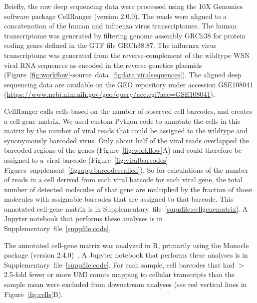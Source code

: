 \documentclass[9pt,lineno]{elife}
\begin{document}
Briefly, the raw deep sequencing data were processed using the 10X Genomics software package CellRanger (version 2.0.0).
The reads were aligned to a concatenation of the human and influenza virus transcriptomes.
The human transcriptome was generated by filtering genome assembly GRCh38 for protein coding genes defined in the GTF file GRCh38.87.
The influenza virus transcriptome was generated from the reverse-complement of the wildtype WSN viral RNA sequences as encoded in the reverse-genetics plasmids (Figure~\ref{fig:workflow}-source~data~\ref{figdata:viralsequences}).
The aligned deep sequencing data are available on the GEO repository under accession GSE108041 (\url{https://www.ncbi.nlm.nih.gov/geo/query/acc.cgi?acc=GSE108041}).

CellRanger calls cells based on the number of observed cell barcodes, and creates a cell-gene matrix.
We used custom Python code to annotate the cells in this matrix by the number of viral reads that could be assigned to the wildtype and synonymously barcoded virus.
Only about half of the viral reads overlapped the barcoded regions of the genes (Figure~\ref{fig:workflow}A) and could therefore be assigned to a viral barcode (Figure~\ref{fig:viralbarcodes}-Figures~supplement~\ref{figsupp:barcodescalled}).
So for calculations of the number of reads in a cell derived from each viral barcode for each viral gene, the total number of detected molecules of that gene are multiplied by the fraction of those molecules with assignable barcodes that are assigned to that barcode.
This annotated cell-gene matrix is in Supplementary~file~\ref{suppfile:cellgenematrix}.
A Jupyter notebook that performs these analyses is in Supplementary~file~\ref{suppfile:code}.

The annotated cell-gene matrix was analyzed in R, primarily using the Monocle package (version 2.4.0)~\citep{Qiu:2017dw,Trapnell:2014kg}.
A Jupyter notebook that performs these analyses is in Supplementary~file~\ref{suppfile:code}.
For each sample, cell barcodes that had $>$2.5-fold fewer or more UMI counts mapping to cellular transcripts than the sample mean were excluded from downstream analyses (see red vertical lines in Figure~\ref{fig:cells}B).
\end{document}
